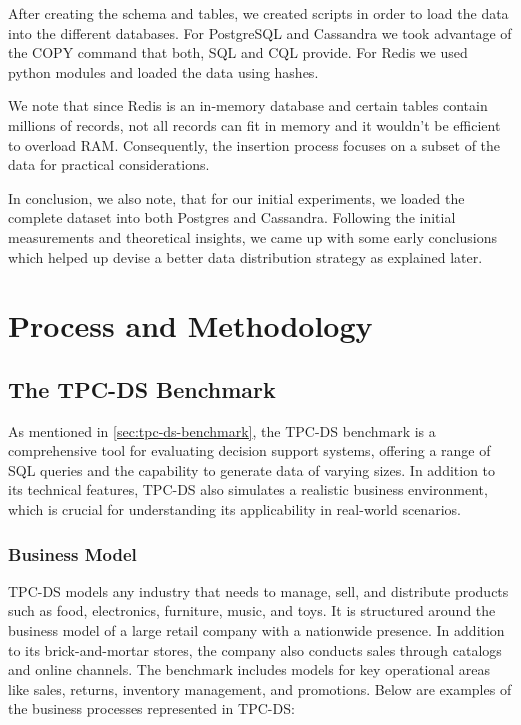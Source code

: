 \documentclass[conference]{IEEEtran}
\begin{document}
After creating the schema and tables, we created scripts in order to load the data into the different databases. For PostgreSQL and Cassandra we took advantage of the COPY command that both, SQL and CQL provide.
For Redis we used python modules and loaded the data using hashes.

We note that since Redis is an in-memory database and certain tables contain millions of records, not all records can fit in memory and it wouldn't be efficient to overload RAM. Consequently, the insertion process
focuses on a subset of the data for practical considerations.

In conclusion, we also note, that for our initial experiments, we loaded the complete dataset into both Postgres and Cassandra. Following the initial measurements and theoretical insights, we came up with some early conclusions
which helped up devise a better data distribution strategy as explained later.

\section{Process and Methodology}

\subsection{The TPC-DS Benchmark}

As mentioned in \ref{sec:tpc-ds-benchmark}, the TPC-DS benchmark is a comprehensive tool for evaluating decision support systems,
offering a range of SQL queries and the capability to generate data of varying sizes. In addition to its
technical features, TPC-DS also simulates a realistic business environment, which is crucial for understanding
its applicability in real-world scenarios.

\subsubsection{Business Model}

TPC-DS models any industry that needs to manage, sell, and distribute products such as food, electronics, furniture, music,
and toys. It is structured around the business model of a large retail company with a nationwide presence. In addition to
its brick-and-mortar stores, the company also conducts sales through catalogs and online channels. The benchmark includes
models for key operational areas like sales, returns, inventory management, and promotions. Below are examples of the
business processes represented in TPC-DS:
\end{document}
